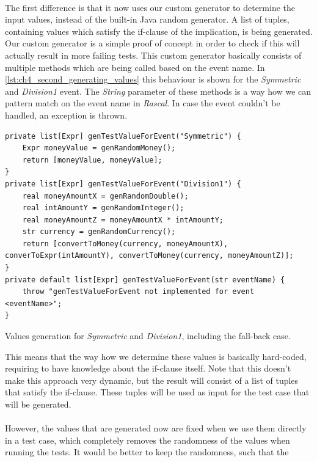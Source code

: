 \\
The first difference is that it now uses our custom generator to determine the
input values, instead of the built-in Java random generator. A list of tuples,
containing values which satisfy the if-clause of the implication, is being
generated. Our custom generator is a simple proof of concept in order to check
if this will actually result in more failing tests. This custom generator
basically consists of multiple methods which are being called based on the event
name. In \autoref{lst:ch4_second_generating_values} this behaviour is shown for
the \textit{Symmetric} and \textit{Division1} event. The \textit{String}
parameter of these methods is a way how we can pattern match on the event name
in \textit{Rascal}. In case the event couldn't be handled, an exception is
thrown.
\FloatBarrier
\begin{sourcecode}[!ht]
\begin{lstlisting}[language=Rascal]
private list[Expr] genTestValueForEvent("Symmetric") {
    Expr moneyValue = genRandomMoney();
    return [moneyValue, moneyValue];
}
private list[Expr] genTestValueForEvent("Division1") {
    real moneyAmountX = genRandomDouble();
    real intAmountY = genRandomInteger();
    real moneyAmountZ = moneyAmountX * intAmountY;
    str currency = genRandomCurrency();
    return [convertToMoney(currency, moneyAmountX), converToExpr(intAmountY), convertToMoney(currency, moneyAmountZ)];
}
private default list[Expr] genTestValueForEvent(str eventName) {
    throw "genTestValueForEvent not implemented for event <eventName>";
}
\end{lstlisting}
\caption{Values generation for \textit{Symmetric} and \textit{Division1}, including the fall-back case.}
\label{lst:ch4_second_generating_values}
\end{sourcecode}
\FloatBarrier
This means that the way how we determine these values is basically hard-coded,
requiring to have knowledge about the if-clause itself. Note that this doesn't
make this approach very dynamic, but the result will consist of a list of tuples
that satisfy the if-clause. These tuples will be used as input for the test case
that will be generated.\\
\\
However, the values that are generated now are fixed when we use them directly
in a test case, which completely removes the randomness of the values when
running the tests. It would be better to keep the randomness, such that the

